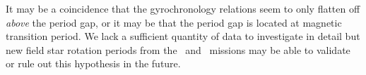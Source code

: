 It may be a coincidence that the gyrochronology relations seem to only flatten
off {\it above} the period gap, or it may be that the period gap is located at
magnetic transition period.
We lack a sufficient quantity of data to investigate in detail but new field
star rotation periods from the \ktwo\ and \tess\ missions may be able to
validate or rule out this hypothesis in the future.
